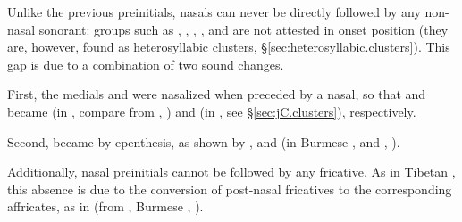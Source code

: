 Unlike the previous preinitials, nasals can never be directly followed by any non-nasal sonorant: groups such as , , , ,  and  are not attested in onset position (they are, however, found as heterosyllabic clusters, §\ref{sec:heterosyllabic.clusters}). This gap is due to a combination of two sound changes. 

First, the medials  and  were nasalized when preceded by a nasal, so that  and  became  (in , compare  from , \citealt[18]{hill2019phonology}) and  (in , see §\ref{sec:jC.clusters}), respectively.  

Second,  became  by epenthesis, as shown by ,  and  (in Burmese ,  and , \citealt[60;259]{hill2019phonology}).

Additionally, nasal preinitials cannot be followed by any fricative. As in Tibetan \citep{lifk33}, this absence is due to the conversion of post-nasal fricatives to the corresponding affricates, as in  (from , Burmese , \citealt[56]{hill2019phonology}).

